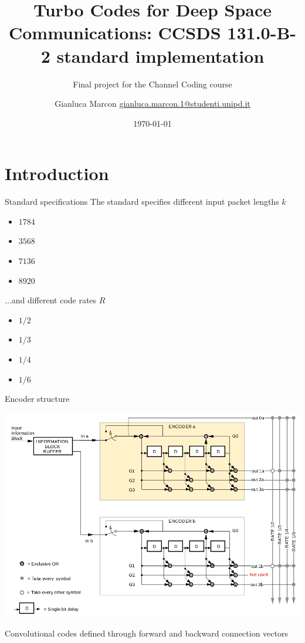 \documentclass[xcolor={usenames,dvipsnames},11pt]{beamer}
\title{ \Large Turbo Codes for Deep Space Communications: CCSDS 131.0-B-2 standard implementation}
\subtitle{Final project for the Channel Coding course}
\author[G. Marcon]{Gianluca Marcon \hfill \href{mailto:gianluca.marcon.1@studenti.unipd.it}{gianluca.marcon.1@studenti.unipd.it}}
\date{\today}
\institute{University of Padova}
\begin{document}
\maketitle

\section{Introduction}
\begin{frame}{Standard specifications}
    The standard specifies different input packet lengths $k$
    \begin{itemize}
        \item $1784$
        \item $3568$
        \item $7136$
        \item $8920$
    \end{itemize}

    ...and different code rates $R$
    \begin{itemize}
        \item $1/2$
        \item $1/3$
        \item $1/4$
        \item $1/6$
    \end{itemize}    
\end{frame}
\begin{frame}{Encoder structure}
    \begin{center}
        \includegraphics[height=0.75\textheight]{./images/encoder-structure}
    \end{center}
    Convolutional codes defined through forward and backward connection vectors
\end{frame}
\end{document}
